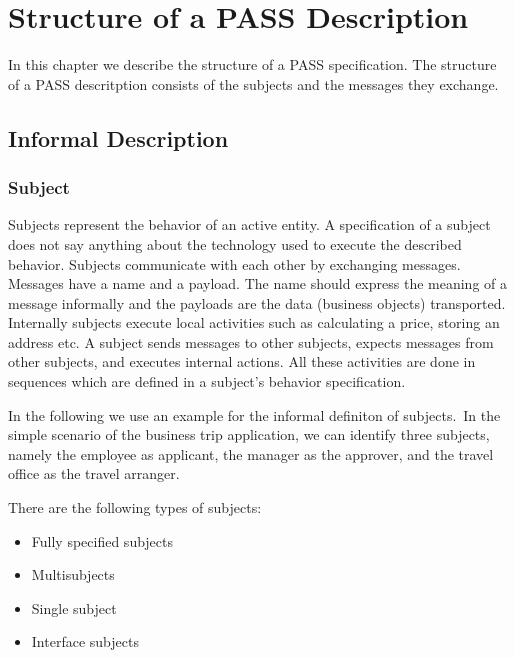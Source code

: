 \chapter{Structure of a PASS Description}
\label{PASSStruct}
	In this chapter we describe the structure of a PASS specification. The structure of a PASS descritption consists of the subjects and the messages they exchange.

\section{Informal Description}
\subsection{Subject}
\label{sec: Subject}

Subjects represent the behavior of an active entity. A specification of a subject does not say anything about the technology used to execute the described behavior. 
Subjects communicate with each other by exchanging messages. Messages have a name and a payload. The name should express the meaning of a message informally and the payloads are the data (business objects) transported. Internally subjects execute local activities such as calculating a price, storing an address etc.
A subject sends messages to other subjects, expects messages from other subjects, and executes internal actions. All these activities are done in sequences which are defined in a subject's behavior specification.

In the following we use an example for the informal definiton of subjects.\
In the simple scenario of the business trip application, we can identify three subjects, namely the employee as applicant, the manager as the approver, and the travel office as the travel arranger.

There are the following types of subjects:
\begin{itemize}
	\item Fully specified subjects 
	\item Multisubjects 
	\item Single subject
	\item Interface subjects 
\end{itemize}

